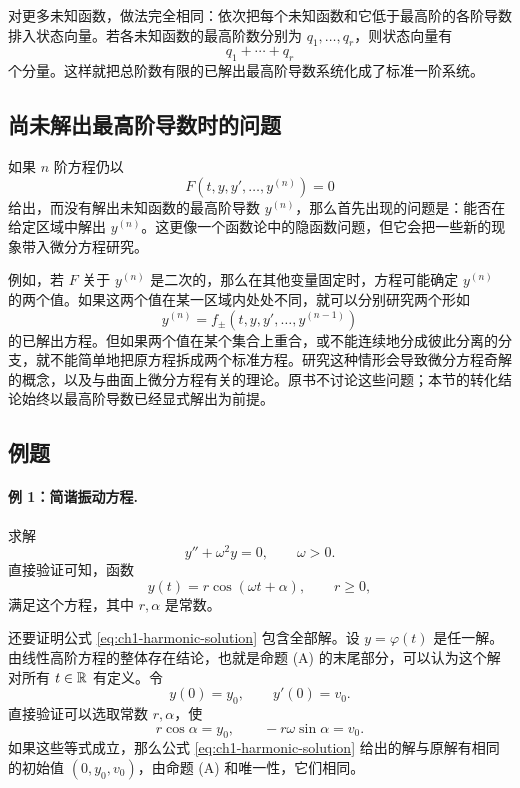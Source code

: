 对更多未知函数，做法完全相同：依次把每个未知函数和它低于最高阶的各阶导数排入状态向量。若各未知函数的最高阶数分别为 \(q_1,\ldots,q_r\)，则状态向量有
\[
 q_1+\cdots+q_r
\]
个分量。这样就把总阶数有限的已解出最高阶导数系统化成了标准一阶系统。

\subsection{尚未解出最高阶导数时的问题}

如果 \(n\) 阶方程仍以
\begin{equation}
 F(t,y,y',\ldots,y^{(n)})=0
 \label{eq:ch1-implicit-high-order}
\end{equation}
给出，而没有解出未知函数的最高阶导数 \(y^{(n)}\)，那么首先出现的问题是：能否在给定区域中解出 \(y^{(n)}\)。这更像一个函数论中的隐函数问题，但它会把一些新的现象带入微分方程研究。

例如，若 \(F\) 关于 \(y^{(n)}\) 是二次的，那么在其他变量固定时，方程可能确定 \(y^{(n)}\) 的两个值。如果这两个值在某一区域内处处不同，就可以分别研究两个形如
\[
 y^{(n)}=f_\pm(t,y,y',\ldots,y^{(n-1)})
\]
的已解出方程。但如果两个值在某个集合上重合，或不能连续地分成彼此分离的分支，就不能简单地把原方程拆成两个标准方程。研究这种情形会导致微分方程奇解的概念，以及与曲面上微分方程有关的理论。原书不讨论这些问题；本节的转化结论始终以最高阶导数已经显式解出为前提。

\subsection{例题}

\paragraph{例 1：简谐振动方程.}
求解
\begin{equation}
 y''+\omega^2y=0,
 \qquad \omega>0.
 \label{eq:ch1-harmonic}
\end{equation}
直接验证可知，函数
\begin{equation}
 y(t)=r\cos(\omega t+\alpha),
 \qquad r\ge0,
 \label{eq:ch1-harmonic-solution}
\end{equation}
满足这个方程，其中 \(r,\alpha\) 是常数。

还要证明公式 \eqref{eq:ch1-harmonic-solution} 包含全部解。设 \(y=\varphi(t)\) 是任一解。由线性高阶方程的整体存在结论，也就是命题 (A) 的末尾部分，可以认为这个解对所有 \(t\in\mathbb R\) 有定义。令
\[
 y(0)=y_0,
 \qquad
 y'(0)=v_0.
\]
直接验证可以选取常数 \(r,\alpha\)，使
\begin{equation}
 r\cos\alpha=y_0,
 \qquad
 -r\omega\sin\alpha=v_0.
 \label{eq:ch1-harmonic-initial-match}
\end{equation}
如果这些等式成立，那么公式 \eqref{eq:ch1-harmonic-solution} 给出的解与原解有相同的初始值 \((0,y_0,v_0)\)，由命题 (A) 和唯一性，它们相同。

